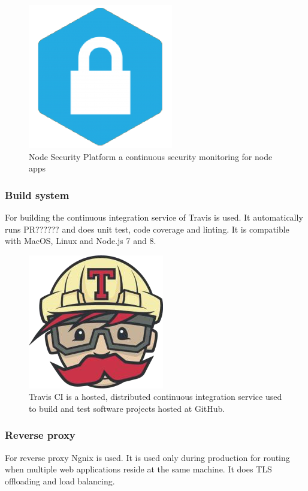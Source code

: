 \begin{figure}[h]
  \begin{center}
    \includegraphics[scale=0.2]{./images/security.png}
    \caption{Node Security Platform a continuous security monitoring for node apps}
    \label{fig:}
  \end{center}
\end{figure}

\subsubsection{Build system}
For building the continuous integration service of Travis is used. It automatically runs PR?????? and does unit test, code coverage and linting. It is compatible with MacOS, Linux and Node.js 7 and 8.

\begin{figure}[h]
  \begin{center}
    \includegraphics[scale=0.3]{./images/travis.png}
    \caption{Travis CI is a hosted, distributed continuous integration service used to build and test software projects hosted at GitHub.}
    \label{fig:}
  \end{center}
\end{figure}

\subsubsection{Reverse proxy}
For reverse proxy Ngnix is used. It is used only during production for routing when multiple web applications reside at the same machine. It does TLS offloading and load balancing.

